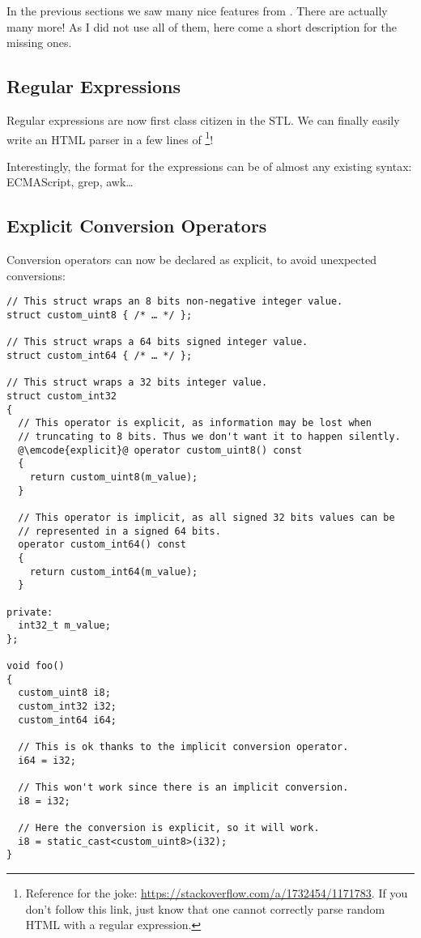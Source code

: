 In the previous sections we saw many nice features from . There
are actually many more! As I did not use all of them, here come a
short description for the missing ones.

\subsection{Regular Expressions}

%
%
Regular expressions are now first class citizen in the STL. We can
finally easily write an HTML parser in a few lines
of \cpp{}\footnote{Reference for the
joke: \url{https://stackoverflow.com/a/1732454/1171783}. If you don't
follow this link, just know that one cannot correctly parse random
HTML with a regular expression.}!

Interestingly, the format for the expressions can be of almost any
existing syntax: ECMAScript, grep, awk…

\subsection{Explicit Conversion Operators}

Conversion operators can now be declared as explicit, to avoid
unexpected conversions:

\begin{lstlisting}
// This struct wraps an 8 bits non-negative integer value.
struct custom_uint8 { /* … */ };

// This struct wraps a 64 bits signed integer value.
struct custom_int64 { /* … */ };

// This struct wraps a 32 bits integer value.
struct custom_int32
{
  // This operator is explicit, as information may be lost when
  // truncating to 8 bits. Thus we don't want it to happen silently.
  @\emcode{explicit}@ operator custom_uint8() const
  {
    return custom_uint8(m_value);
  }

  // This operator is implicit, as all signed 32 bits values can be
  // represented in a signed 64 bits.
  operator custom_int64() const
  {
    return custom_int64(m_value);
  }

private:
  int32_t m_value;
};

void foo()
{
  custom_uint8 i8;
  custom_int32 i32;
  custom_int64 i64;

  // This is ok thanks to the implicit conversion operator.
  i64 = i32;

  // This won't work since there is an implicit conversion.
  i8 = i32;

  // Here the conversion is explicit, so it will work.
  i8 = static_cast<custom_uint8>(i32);
}
\end{lstlisting}


